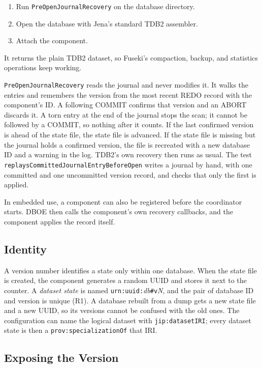 \documentclass[11pt,a4paper]{article}
\newcommand{\code}[1]{\texttt{#1}}
\begin{document}
\begin{enumerate}
\item Run \code{PreOpenJournalRecovery} on the database directory.
\item Open the database with Jena's standard TDB2 assembler.
\item Attach the component.
\end{enumerate}

It returns the plain TDB2 dataset, so Fuseki's compaction, backup, and statistics operations
keep working.

\code{PreOpenJournalRecovery} reads the journal and never modifies it. It walks the entries
and remembers the version from the most recent REDO record with the component's ID. A
following COMMIT confirms that version and an ABORT discards it. A torn entry at the end of
the journal stops the scan; it cannot be followed by a COMMIT, so nothing after it counts. If
the last confirmed version is ahead of the state file, the state file is advanced. If the
state file is missing but the journal holds a confirmed version, the file is recreated with a
new database ID and a warning in the log. TDB2's own recovery then runs as usual. The test
\code{replaysCommittedJournalEntryBeforeOpen} writes a journal by hand, with one committed and
one uncommitted version record, and checks that only the first is applied.

In embedded use, a component can also be registered before the coordinator starts. DBOE then
calls the component's own recovery callbacks, and the component applies the record itself.

\subsection{Identity}
\label{sec:identity}

A version number identifies a state only within one database. When the state file is
created, the component generates a random UUID and stores it next to the counter. A
\emph{dataset state} is named \code{urn:uuid:}\textit{db}\code{\#v}\textit{N}, and the pair of
database ID and version is unique (R1). A database rebuilt from a dump gets a new state file
and a new UUID, so its versions cannot be confused with the old ones. The configuration can name
the logical dataset with \code{jip:datasetIRI}; every dataset state is then a
\code{prov:specializationOf} that IRI.

\subsection{Exposing the Version}
\label{sec:exposure}
\end{document}
